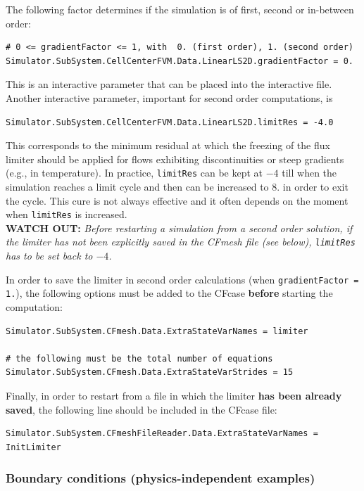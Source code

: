 \documentclass[11pt]{article}
\begin{document}
The following factor determines if the simulation is of first, second or in-between order:

\begin{lstlisting}[breaklines]
# 0 <= gradientFactor <= 1, with  0. (first order), 1. (second order)
Simulator.SubSystem.CellCenterFVM.Data.LinearLS2D.gradientFactor = 0.
\end{lstlisting}
This is an interactive parameter that can be placed into the interactive file. Another interactive parameter,
important for second order computations, is 

\begin{lstlisting}[breaklines]
Simulator.SubSystem.CellCenterFVM.Data.LinearLS2D.limitRes = -4.0
\end{lstlisting}
This corresponds to the minimum residual at which the freezing of the flux limiter should be applied for flows exhibiting discontinuities 
or steep gradients (e.g., in temperature). In practice, {\tt limitRes} can be kept at  $-4$ till when the simulation reaches a limit cycle and then can be increased to
$8.$ in order to exit the cycle. This cure is not always effective and it often depends on the moment when {\tt limitRes} is increased.\\
{\bf WATCH OUT:} {\it Before restarting a simulation from a second order solution, if the limiter has not been explicitly saved in the CFmesh file 
  (see below), {\tt limitRes} has to be set back to $-4$.}

In order to save the limiter in second order calculations (when {\tt gradientFactor = 1.}), the following options must be added to the CFcase {\bf before} 
starting the computation:

\begin{lstlisting}[breaklines]
Simulator.SubSystem.CFmesh.Data.ExtraStateVarNames = limiter

# the following must be the total number of equations
Simulator.SubSystem.CFmesh.Data.ExtraStateVarStrides = 15
\end{lstlisting}

Finally, in order to restart from a file in which the limiter {\bf has been already saved}, 
the following line should be included in the CFcase file:

\begin{lstlisting}[breaklines]
Simulator.SubSystem.CFmeshFileReader.Data.ExtraStateVarNames = InitLimiter
\end{lstlisting}

\subsubsection{Boundary conditions (physics-independent examples)}
\end{document}
